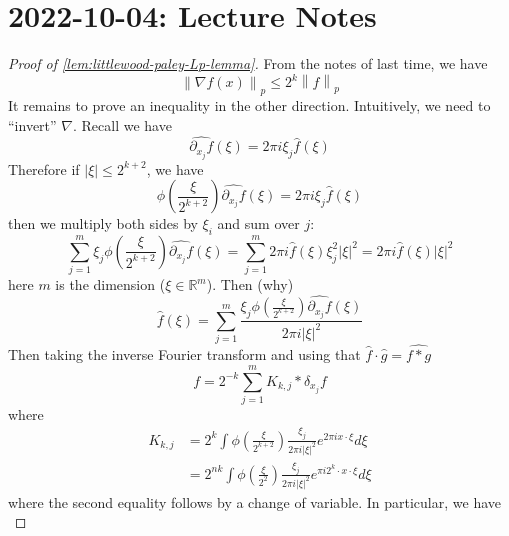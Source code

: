 \documentclass{article}
\def\R{\mathbb{R}} %
\newcommand\norm[1]{\left\lVert#1\right\rVert}
\begin{document}
\section{2022-10-04: Lecture Notes}
\begin{proof}[Proof of \cref{lem:littlewood-paley-Lp-lemma}]
  From the notes of last time, we have
  \begin{equation*}
    \norm{\nabla f(x)}_{p} \leq  2^{k}\norm{f}_{p}
  \end{equation*}
  It remains to prove an inequality in the other direction. Intuitively, we need to ``invert'' $\nabla$. Recall
  we have
  \begin{equation*}
    \widehat{\partial_{x_{j}}f}(\xi) = 2\pi i\xi_{j} \widehat{f}(\xi)
  \end{equation*}
  Therefore if $|\xi| \leq  2^{k+2}$, we have
  \begin{equation*}
    \phi\left(\frac{\xi}{2^{k+2}}\right)\widehat{\partial_{x_{j}}f}(\xi) = 2\pi i \xi_{j}\widehat{f}(\xi)
  \end{equation*}
  then we multiply both sides by $\xi_{i}$ and sum over $j$:
  \begin{equation*}
    \sum_{j=1}^{m} \xi_{j}\phi\left(\frac{\xi}{2^{k+2}}\right)\widehat{\partial_{x_{j}}f}(\xi) 
    = \sum_{j=1}^{m} 2\pi i \widehat{f}(\xi)\xi^{2}_{j}|\xi|^{2}
    = 2\pi i \hat{f}(\xi)|\xi|^{2}
  \end{equation*}
  here $m$ is the dimension ($\xi\in \R^m$). Then (why)
  \begin{equation*}
    \widehat{f}(\xi) 
    = \sum_{j=1}^{m} \frac{\xi_{j}\phi \left( \frac{\xi}{2^{k+2}} \right) \widehat{\partial_{x_{j}}f}(\xi) }{2\pi i |\xi|^{2}} 
  \end{equation*}
  Then taking the inverse Fourier transform and using that $\widehat{f}\cdot\widehat{g}=
  \widehat{f*g}$
  \begin{equation}\label{eq:4} 
    f = 2^{-k}\sum_{j=1}^{m}K_{k,j}* \delta_{x_{j}}f 
  \end{equation}
  where
  \begin{align*}
    K_{k,j} 
    &= 2^{k}\int \phi \left( \frac{\xi}{2^{k+2}}
      \right)\frac{\xi_{j}}{2\pi i |\xi|^{2}} e^{2\pi i x \cdot \xi} d\xi\\
    &=2^{nk} \int \phi \left( \frac{\xi}{2^{2}} \right) \frac{\xi_{j}}{2\pi i |\xi|^{2}}e^{\pi i 2^{k}\cdot x\cdot \xi}d\xi 
  \end{align*}
  where the second equality follows by a change of variable. In particular, we
  have
  \begin{equation*}

\end{equation*}
\end{proof}
\end{document}
